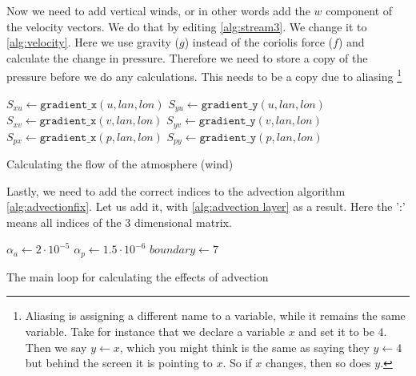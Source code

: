 Now we need to add vertical winds, or in other words add the $w$ component of the velocity vectors. We do that by editing \autoref{alg:stream3}. We change it to \autoref{alg:velocity}. Here we 
use gravity ($g$) instead of the coriolis force ($f$) and calculate the change in pressure. Therefore we need to store a copy of the pressure before we do any calculations. This needs to be a
copy due to aliasing \footnote{Aliasing is assigning a different name to a variable, while it remains the same variable. Take for instance that we declare a variable $x$ and set it to be $4$. 
Then we say $y \leftarrow x$, which you might think is the same as saying they $y \leftarrow 4$ but behind the screen it is pointing to $x$. So if $x$ changes, then so does $y$.}

\begin{algorithm}
    $S_{xu} \leftarrow \texttt{gradient\_x}(u, lan, lon)$ \;
    $S_{yu} \leftarrow \texttt{gradient\_y}(u, lan, lon)$ \;
    $S_{xv} \leftarrow \texttt{gradient\_x}(v, lan, lon)$ \;
    $S_{yv} \leftarrow \texttt{gradient\_y}(v, lan, lon)$ \;
    $S_{px} \leftarrow \texttt{gradient\_x}(p, lan, lon)$ \;
    $S_{py} \leftarrow \texttt{gradient\_y}(p, lan, lon)$ \;
    \caption{Calculating the flow of the atmosphere (wind)}
    \label{alg:velocity}
\end{algorithm}

Lastly, we need to add the correct indices to the advection algorithm \autoref{alg:advectionfix}. Let us add it, with \autoref{alg:advection layer} as a result. Here the ':' means all indices 
of the 3 dimensional matrix.

\begin{algorithm}
    $\alpha_a \leftarrow 2 \cdot 10^{-5}$ \;
    $\alpha_p \leftarrow 1.5 \cdot 10^{-6}$ \;
    $boundary \leftarrow 7$ \;
    \caption{The main loop for calculating the effects of advection}
    \label{alg:advection layer}
\end{algorithm}